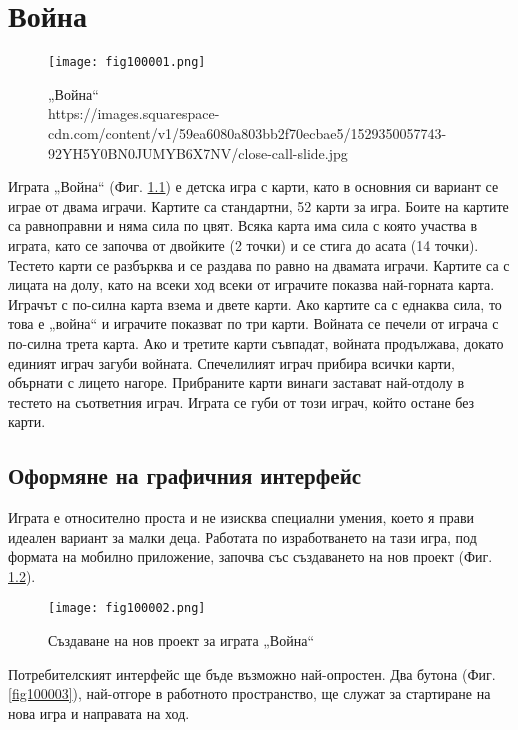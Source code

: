\chapter{Война}

\begin{figure}[H]
  \centering
  \texttt{[image: fig100001.png]}
  \caption{„Война“ \\ https://images.squarespace-cdn.com/content/v1/59ea6080a803bb2f70ecbae5/1529350057743-92YH5Y0BN0JUMYB6X7NV/close-call-slide.jpg}
\label{fig100001}
\end{figure}

Играта „Война“ (Фиг. \ref{fig100001}) е детска игра с карти, като в основния си вариант се играе от двама играчи. Картите са стандартни, 52 карти за игра. Боите на картите са равноправни и няма сила по цвят. Всяка карта има сила с която участва в играта, като се започва от двойките (2 точки) и се стига до асата (14 точки). Тестето карти се разбърква и се раздава по равно на двамата играчи. Картите са с лицата на долу, като на всеки ход всеки от играчите показва най-горната карта. Играчът с по-силна карта взема и двете карти. Ако картите са с еднаква сила, то това е „война“ и играчите показват по три карти. Войната се печели от играча с по-силна трета карта. Ако и третите карти съвпадат, войната продължава, докато единият играч загуби войната. Спечелилият играч прибира всички карти, обърнати с лицето нагоре. Прибраните карти винаги застават най-отдолу в тестето на съответния играч. Играта се губи от този играч, който остане без карти. 

\section{Оформяне на графичния интерфейс}

Играта е относително проста и не изисква специални умения, което я прави идеален вариант за малки деца. Работата по изработването на тази игра, под формата на мобилно приложение, започва със създаването на нов проект (Фиг. \ref{fig100002}).

\begin{figure}[H]
  \centering
  \texttt{[image: fig100002.png]}
  \caption{Създаване на нов проект за играта „Война“}
\label{fig100002}
\end{figure}

Потребителският интерфейс ще бъде възможно най-опростен. Два бутона (Фиг. \ref{fig100003}), най-отгоре в работното пространство, ще служат за стартиране на нова игра и направата на ход.

